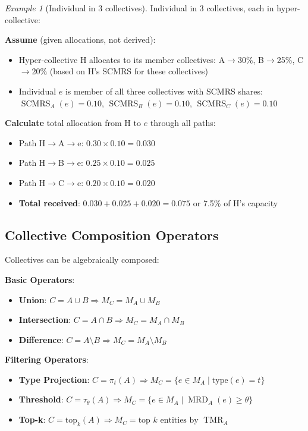 \documentclass[11pt,a4paper]{article}
\theoremstyle{definition}
\theoremstyle{remark}
\newtheorem{example}[theorem]{Example}
\DeclareMathOperator{\TMR}{TMR}
\DeclareMathOperator{\SCMRS}{SCMRS}
\DeclareMathOperator{\MRD}{MRD}
\begin{document}
\begin{example}[Individual in 3 collectives]
Individual in 3 collectives, each in hyper-collective:

\textbf{Assume} (given allocations, not derived):
\begin{itemize}
\item Hyper-collective H allocates to its member collectives: A$\rightarrow$30\%, B$\rightarrow$25\%, C$\rightarrow$20\% (based on H's SCMRS for these collectives)
\item Individual $e$ is member of all three collectives with SCMRS shares: $\SCMRS_A(e)=0.10$, $\SCMRS_B(e)=0.10$, $\SCMRS_C(e)=0.10$
\end{itemize}

\textbf{Calculate} total allocation from H to $e$ through all paths:
\begin{itemize}
\item Path H$\rightarrow$A$\rightarrow$e: $0.30 \times 0.10 = 0.030$
\item Path H$\rightarrow$B$\rightarrow$e: $0.25 \times 0.10 = 0.025$
\item Path H$\rightarrow$C$\rightarrow$e: $0.20 \times 0.10 = 0.020$
\item \textbf{Total received}: $0.030 + 0.025 + 0.020 = 0.075$ or 7.5\% of H's capacity
\end{itemize}
\end{example}

\subsection{Collective Composition Operators}

Collectives can be algebraically composed:

\textbf{Basic Operators}:
\begin{itemize}
\item \textbf{Union}: $C = A \cup B \Rightarrow M_C = M_A \cup M_B$
\item \textbf{Intersection}: $C = A \cap B \Rightarrow M_C = M_A \cap M_B$
\item \textbf{Difference}: $C = A \setminus B \Rightarrow M_C = M_A \setminus M_B$
\end{itemize}

\textbf{Filtering Operators}:
\begin{itemize}
\item \textbf{Type Projection}: $C = \pi_t(A) \Rightarrow M_C = \{ e \in M_A \mid \text{type}(e) = t \}$
\item \textbf{Threshold}: $C = \tau_\theta(A) \Rightarrow M_C = \{ e \in M_A \mid \MRD_A(e) \ge \theta \}$
\item \textbf{Top-k}: $C = \text{top}_k(A) \Rightarrow M_C = \text{top } k \text{ entities by } \TMR_A$
\end{itemize}
\end{document}
